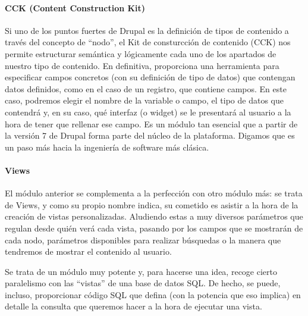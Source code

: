 \paragraph{CCK (Content Construction Kit)}
\par Si uno de los puntos fuertes de Drupal es la definición de tipos de contenido a través del concepto de ``nodo'', el Kit de consturcción de contenido (CCK) nos permite estructurar semántica y lógicamente cada uno de los apartados de nuestro tipo de contenido. En definitiva, proporciona una herramienta para especificar campos concretos (con su definición de tipo de datos) que contengan datos definidos, como en el caso de un registro, que contiene campos. En este caso, podremos elegir el nombre de la variable o campo, el tipo de datos que contendrá y, en su caso, qué interfaz (o widget) se le presentará al usuario a la hora de tener que rellenar ese campo. Es un módulo tan esencial que a partir de la versión 7 de Drupal forma parte del núcleo de la plataforma. Digamos que es un paso más hacia la ingeniería de software más clásica.

\paragraph{Views}
\par El módulo anterior se complementa a la perfección con otro módulo más: se trata de Views, y como su propio nombre indica, su cometido es asistir a la hora de la creación de vistas personalizadas. Aludiendo estas a muy diversos parámetros que regulan desde quién verá cada vista, pasando por los campos que se mostrarán de cada nodo, parámetros disponibles para realizar búsquedas o la manera que tendremos de mostrar el contenido al usuario.
\par Se trata de un módulo muy potente y, para hacerse una idea, recoge cierto paralelismo con las ``vistas'' de una base de datos SQL. De hecho, se puede, incluso, proporcionar código SQL que defina (con la potencia que eso implica) en detalle la consulta que queremos hacer a la hora de ejecutar una vista.

